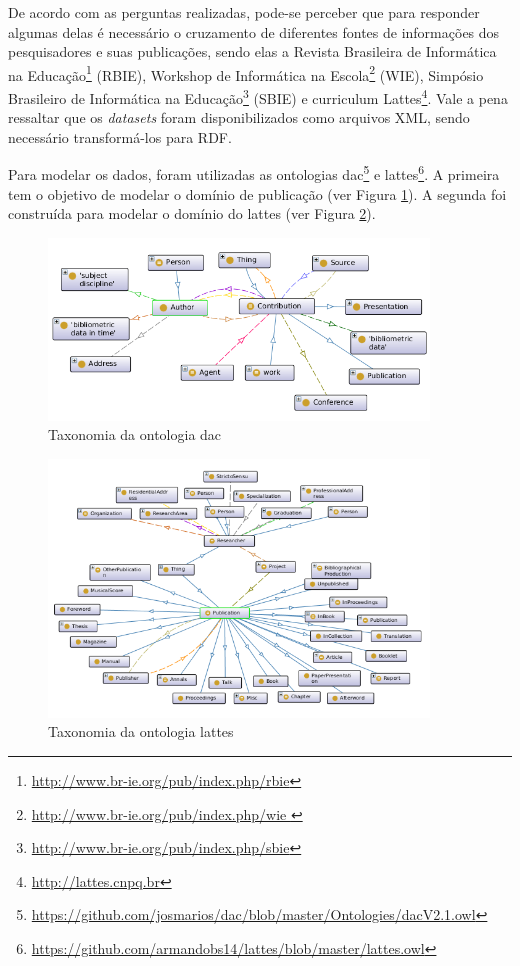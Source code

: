 De acordo com as perguntas realizadas, pode-se perceber que para responder algumas delas é necessário o cruzamento de diferentes fontes de informações dos pesquisadores e suas publicações, sendo elas a Revista Brasileira de Informática na Educação\footnote{\url{http://www.br-ie.org/pub/index.php/rbie}} (RBIE), Workshop de Informática na Escola\footnote{\url{http://www.br-ie.org/pub/index.php/wie }} (WIE), Simpósio Brasileiro de Informática na Educação\footnote{\url{http://www.br-ie.org/pub/index.php/sbie}} (SBIE) e curriculum Lattes\footnote{\url{http://lattes.cnpq.br}}. Vale a pena ressaltar que os \textit{datasets} foram disponibilizados como arquivos XML, sendo necessário transformá-los para RDF.

Para modelar os dados, foram utilizadas as ontologias dac\footnote{\url{https://github.com/josmarios/dac/blob/master/Ontologies/dacV2.1.owl}} e lattes\footnote{\url{https://github.com/armandobs14/lattes/blob/master/lattes.owl}}. A primeira tem o objetivo de modelar o domínio de publicação (ver Figura \ref{fig:dac}). A segunda foi construída para modelar o domínio do lattes (ver Figura \ref{fig:lattes}).

\begin{figure}[!ht]
	\centering
	\includegraphics[width=0.9\textwidth]{./imagens/dac-mainview.png}
	\caption{Taxonomia da ontologia dac}
	\label{fig:dac}
\end{figure}

\begin{figure}[!ht]
	\centering
	\includegraphics[width=0.9\textwidth]{./imagens/lattes-mainview.png}
	\caption{Taxonomia da ontologia lattes}
	\label{fig:lattes}
\end{figure}

